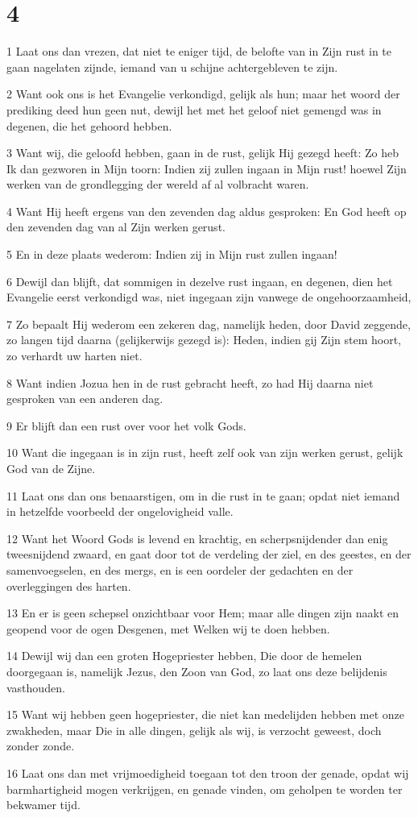 \chapter{4}

\par 1 Laat ons dan vrezen, dat niet te eniger tijd, de belofte van in Zijn rust in te gaan nagelaten zijnde, iemand van u schijne achtergebleven te zijn.
\par 2 Want ook ons is het Evangelie verkondigd, gelijk als hun; maar het woord der prediking deed hun geen nut, dewijl het met het geloof niet gemengd was in degenen, die het gehoord hebben.
\par 3 Want wij, die geloofd hebben, gaan in de rust, gelijk Hij gezegd heeft: Zo heb Ik dan gezworen in Mijn toorn: Indien zij zullen ingaan in Mijn rust! hoewel Zijn werken van de grondlegging der wereld af al volbracht waren.
\par 4 Want Hij heeft ergens van den zevenden dag aldus gesproken: En God heeft op den zevenden dag van al Zijn werken gerust.
\par 5 En in deze plaats wederom: Indien zij in Mijn rust zullen ingaan!
\par 6 Dewijl dan blijft, dat sommigen in dezelve rust ingaan, en degenen, dien het Evangelie eerst verkondigd was, niet ingegaan zijn vanwege de ongehoorzaamheid,
\par 7 Zo bepaalt Hij wederom een zekeren dag, namelijk heden, door David zeggende, zo langen tijd daarna (gelijkerwijs gezegd is): Heden, indien gij Zijn stem hoort, zo verhardt uw harten niet.
\par 8 Want indien Jozua hen in de rust gebracht heeft, zo had Hij daarna niet gesproken van een anderen dag.
\par 9 Er blijft dan een rust over voor het volk Gods.
\par 10 Want die ingegaan is in zijn rust, heeft zelf ook van zijn werken gerust, gelijk God van de Zijne.
\par 11 Laat ons dan ons benaarstigen, om in die rust in te gaan; opdat niet iemand in hetzelfde voorbeeld der ongelovigheid valle.
\par 12 Want het Woord Gods is levend en krachtig, en scherpsnijdender dan enig tweesnijdend zwaard, en gaat door tot de verdeling der ziel, en des geestes, en der samenvoegselen, en des mergs, en is een oordeler der gedachten en der overleggingen des harten.
\par 13 En er is geen schepsel onzichtbaar voor Hem; maar alle dingen zijn naakt en geopend voor de ogen Desgenen, met Welken wij te doen hebben.
\par 14 Dewijl wij dan een groten Hogepriester hebben, Die door de hemelen doorgegaan is, namelijk Jezus, den Zoon van God, zo laat ons deze belijdenis vasthouden.
\par 15 Want wij hebben geen hogepriester, die niet kan medelijden hebben met onze zwakheden, maar Die in alle dingen, gelijk als wij, is verzocht geweest, doch zonder zonde.
\par 16 Laat ons dan met vrijmoedigheid toegaan tot den troon der genade, opdat wij barmhartigheid mogen verkrijgen, en genade vinden, om geholpen te worden ter bekwamer tijd.

